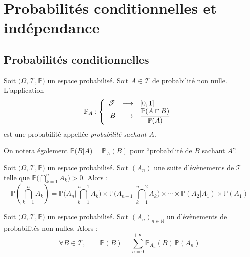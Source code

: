\documentclass[11pt,a4paper,fleqn,pdftex]{report}
\begin{document}
\section{Probabilités conditionnelles et indépendance} %
\label{sec:independance}
\subsection{Probabilités conditionnelles} %
\label{sub:probabilites_conditionnelles}
\begin{itheorem}
     Soit $\big( \Omega , \mathscr{T}, \mathbb{P} \big)$ un espace probabilisé. \newline
     Soit $A \in \mathscr{T}$ de probabilité non nulle. \\
     L'application 
     \begin{equation}
     \mathbb{P}_A : \left\lbrace
     \begin{array}{r c l}
          \mathscr{T} &\longrightarrow & [0,1] \\
          B &\longmapsto & \dfrac{\mathbb{P} (A\cap B)}{\mathbb{P} (A)}
     \end{array}
     \right.
     \end{equation}
     est une probabilité appellée \emph{probabilité sachant $A$}.
\end{itheorem}
On notera également $\mathbb{P}\big( B | A\big) = \mathbb{P}_A(B)$ pour ``probabilité de $B$ sachant $A$''.
\begin{theorem}
     Soit $\big( \Omega , \mathscr{T}, \mathbb{P} \big)$ un espace probabilisé. \newline
     Soit $(A_n)$ une suite d'évènements de $\mathscr{T}$ telle que $\mathbb{P} \Big( \bigcap_{k=1}^n A_k \Big) > 0$. Alors :
     \begin{equation}
     \mathbb{P} \left( \bigcap_{k=1}^n A_k \right) = \mathbb{P}\Bigg(A_n \Bigg| \bigcap_{k=1}^{n-1} A_k \Bigg) \times \mathbb{P}\Bigg(A_{n-1} \Bigg| \bigcap_{k=1}^{n-2} A_k \Bigg) \times \cdots \times \mathbb{P}(A_2|A_1) \times \mathbb{P}(A_1)
     \end{equation}
\end{theorem}
\begin{itheorem}
     Soit $\big( \Omega , \mathscr{T}, \mathbb{P} \big)$ un espace probabilisé. \newline
     Soit $(A_n)_{n\in\mathbb{N}}$ un  d'évènements de probabilités non nulles. Alors :
     \begin{equation}
     \forall B\in \mathscr{T},\qquad \mathbb{P}(B) = \sum_{n=0}^{+\infty} \mathbb{P}_{A_n}(B)\, \mathbb{P}(A_n)
     \end{equation}
\end{itheorem}
\end{document}
